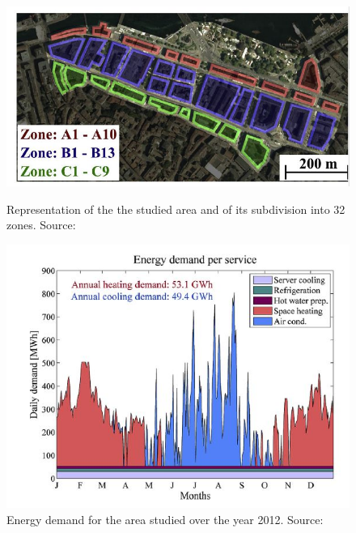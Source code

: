 \documentclass{article}
\begin{document}
\begin{figure}[!htb]
	\centering
	\begin{minipage}{.45\textwidth}
		\centering
		\includegraphics[width=\textwidth,height=0.2\textheight]{henchoz_gva.JPG}
		\caption{Representation of the the studied area and of its subdivision into 32 zones. Source: \cite{henchozPotentialRefrigerantBased}}
		\label{fig:henchoz_gva}
	\end{minipage}%
\hspace{1cm}
	\begin{minipage}{0.45\textwidth}
		\centering
		\includegraphics[width=\textwidth,height=0.2\textheight]{henchoz_energydemand.JPG}
		\caption{Energy demand for the area studied over the year 2012. Source: \cite{henchozPotentialRefrigerantBased}}
		\label{fig:henchoz_energydemand}
	\end{minipage}
\end{figure}
\end{document}
